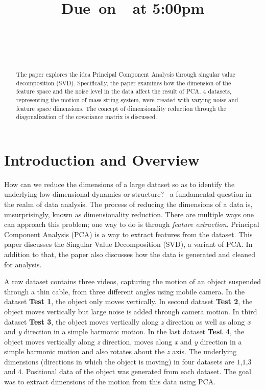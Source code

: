 \documentclass{article}
\title{
    \vspace{2in}
    \textmd{\textbf{\hmwkClass}}\\
    \vspace{0.3in}\textmd{\textbf{\hmwkTitle}}\\
    \normalsize\vspace{0.1in}\small{Due\ on\ \hmwkDueDate\ at 5:00pm}\\
    \vspace{0.1in}\large{\textit{\hmwkClassInstructor}} \\
    \vspace{0.1in}\large{{\hmwkClassSection}} \\
    \vspace{2.5in}
}
\author{\hmwkAuthorName}
\date{}
\begin{document}
\maketitle
\pagebreak

\begin{abstract}
The paper explores the idea Principal Component Analysis through singular value decomposition (SVD). Specifically, the paper examines how the dimension of the feature space and the noise level in the data affect the result of PCA. $4$ datasets, representing the motion of mass-string system, were created with varying noise and feature space dimensions. The concept of dimensionality reduction through the diagonalization of the covariance matrix is discussed.

\end{abstract}

\section{Introduction and Overview}
How can we reduce the dimensions of a large dataset so as to identify the underlying low-dimensional dynamics or structure?-- a fundamental question in the realm of data analysis. The process of reducing the dimensions of a data is, unsurprisingly, known as dimensionality reduction. There are multiple ways one can approach this problem; one way to do is through \emph{feature extraction}. Principal Component Analysis (PCA) is a way to extract features from the dataset. This paper discusses the Singular Value Decomposition (SVD), a variant of PCA. In addition to that, the paper also discusses how the data is generated and cleaned for analysis.

A raw dataset contains three videos, capturing the motion of an object suspended through a thin cable, from three different angles using mobile camera. In the dataset \textbf{Test 1}, the object only moves vertically. In second dataset \textbf{Test 2}, the object moves vertically but large noise is added through camera motion. In third dataset \textbf{Test 3}, the object moves vertically along \emph{z} direction as well as along \emph{x} and \emph{y} direction in a simple harmonic motion. In the last dataset \textbf{Test 4}, the object moves vertically along \emph{z} direction, moves along \emph{x} and \emph{y} direction in a simple harmonic motion and also rotates about the \emph{z} axis. The underlying dimensions (directions in which the object is moving) in four datasets are $1$,$1$,$3$ and $4$. Positional data of the object was generated from each dataset. The goal was to extract dimensions of the motion from this data using PCA.
\end{document}
